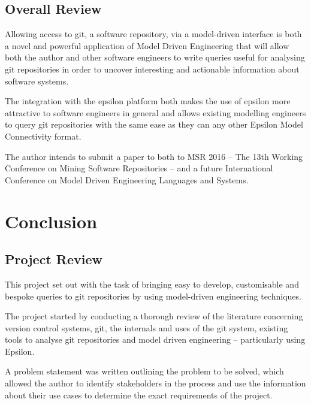 \documentclass[11pt]{book}
\begin{document}
\section{Overall Review}
Allowing access to git, a software repository, via a model-driven interface is both a novel and powerful application of Model Driven Engineering that will allow both the author and other software engineers to write queries useful for analysing git repositories in order to uncover interesting and actionable information about software systems.

The integration with the epsilon platform both makes the use of epsilon more attractive to software engineers in general and allows existing modelling engineers to query git repositories with the same ease as they can any other Epsilon Model Connectivity format.

The author intends to submit a paper to both to MSR 2016 -- The 13th Working Conference on Mining Software Repositories \cite{msr2016} -- and a future International Conference on Model Driven Engineering Languages and Systems.


\chapter{Conclusion}
\section{Project Review}
This project set out with the task of bringing easy to develop, customisable and bespoke queries to git repositories by using model-driven engineering techniques. 

The project started by conducting a thorough review of the literature concerning version control systems, git, the internals and uses of the git system, existing tools to analyse git repositories and model driven engineering -- particularly using Epsilon.

A problem statement was written outlining the problem to be solved, which allowed the author to identify stakeholders in the process and use the information about their use cases to determine the exact requirements of the project.
\end{document}
